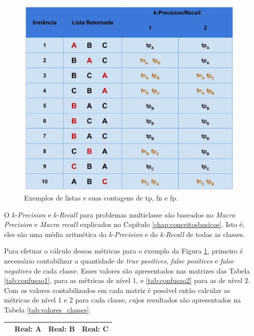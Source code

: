 {\begin{figure}[h!]
  \centering
  \includegraphics[width=120mm,scale=0.8]{images/descricaodostestes03.eps}
  \caption{Exemplos de listas e suas contagens de tp, fn e fp.}
  \label{fig:descricaodostestes03}
\end{figure}

O \textit{k-Precision} e \textit{k-Recall} para problemas multiclasse são baseados no \textit{Macro Precision} e \textit{Macro recall} explicados no Capítulo \ref{chap:conceitosbasicos}.
Isto é, eles são uma média aritmética do \textit{k-Precision} e do \textit{k-Recall} de todas as classes. 

Para efetuar o cálculo dessas métricas para o exemplo da Figura \ref{fig:descricaodostestes03}, primeiro é necessário contabilizar a quantidade de \textit{true positives}, \textit{false positives} e \textit{false negatives} de cada classe.
Esses valores são apresentados nas matrizes das Tabela \ref{tab:confusao1}, para as métricas de nível 1, e \ref{tab:confusao2} para as de nível 2.
Com os valores contabilizados em cada matriz é possível então calcular as métricas de nível 1 e 2 para cada classe, cujos resultados são apresentados na Tabela \ref{tab:valores_classes}.

\begin{table}[h!]
  \begin{center}
    \begin{tabular}{cccc}
      \hline
         & \textbf{Real: A} & \textbf{Real: B} & \textbf{Real: C} \\
      \hline


\end{tabular}
\end{center}
\end{table}}
